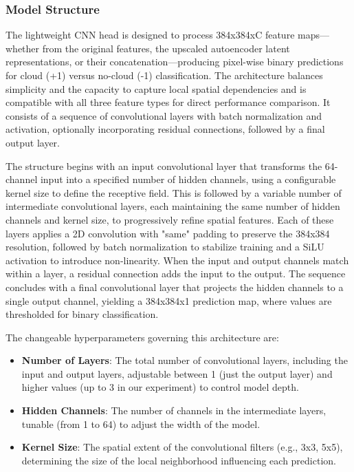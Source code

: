 \documentclass[10pt,letterpaper]{article}
\begin{document}
\subsubsection{Model Structure}

The lightweight CNN head is designed to process 384x384xC feature maps—whether from the original features, the upscaled autoencoder latent representations, or their concatenation—producing pixel-wise binary predictions for cloud (+1) versus no-cloud (-1) classification. The architecture balances simplicity and the capacity to capture local spatial dependencies and is compatible with all three feature types for direct performance comparison. It consists of a sequence of convolutional layers with batch normalization and activation, optionally incorporating residual connections, followed by a final output layer.

The structure begins with an input convolutional layer that transforms the 64-channel input into a specified number of hidden channels, using a configurable kernel size to define the receptive field. This is followed by a variable number of intermediate convolutional layers, each maintaining the same number of hidden channels and kernel size, to progressively refine spatial features. Each of these layers applies a 2D convolution with "same" padding to preserve the 384x384 resolution, followed by batch normalization to stabilize training and a SiLU activation to introduce non-linearity. When the input and output channels match within a layer, a residual connection adds the input to the output. The sequence concludes with a final convolutional layer that projects the hidden channels to a single output channel, yielding a 384x384x1 prediction map, where values are thresholded for binary classification.

The changeable hyperparameters governing this architecture are:

\begin{itemize}
    \item \textbf{Number of Layers}: The total number of convolutional layers, including the input and output layers, adjustable between 1 (just the output layer) and higher values (up to 3 in our experiment) to control model depth.
    \item \textbf{Hidden Channels}: The number of channels in the intermediate layers, tunable (from 1 to 64) to adjust the width of the model.
    \item \textbf{Kernel Size}: The spatial extent of the convolutional filters (e.g., 3x3, 5x5), determining the size of the local neighborhood influencing each prediction.
\end{itemize}
\end{document}

